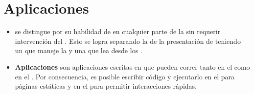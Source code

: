 
\section{Aplicaciones \webINT}\label{cap:estadoArte:section:web_app}

\begin{itemize}
	\item
		\textbf{\singlePageAppINT} se distingue por su habilidad de \redrawCPT en cualquier parte de la \uiSiglaAS sin requerir intervención del \serverAS. Esto se logra separando la \dataPC de la presentación de \dataPC teniendo un \modelLayerAS que maneje la \dataPC y una \viewsLayerAS que lea desde los \modelsAS.
	\item
		\textbf{Aplicaciones \isomorphicAS \javaScriptNAME} son aplicaciones escritas en \javaScriptNAME que pueden correr tanto en el \clientAS como en el \serverAS. Por consecuencia, es posible escribir código y ejecutarlo en el \serverAS para \renderCPT páginas estáticas y en el \clientAS para permitir interacciones rápidas.
\end{itemize}

%

